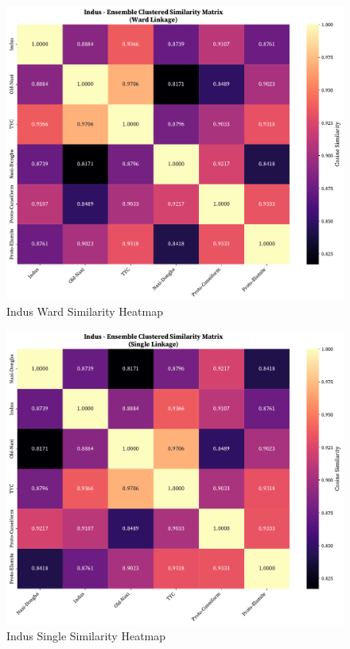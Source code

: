 \documentclass[11pt,a4paper,oneside]{report}
\begin{document}
 \begin{figure}[H]
    \centering
    \includegraphics[width=0.8\linewidth]{Visualizations/Clustered Heatmaps/Indus/ensemble_clustered_similarity_ward.pdf}
     \caption*{Indus Ward Similarity Heatmap}
\end{figure}
 \begin{figure}[H]
    \centering
    \includegraphics[width=0.8\linewidth]{Visualizations/Clustered Heatmaps/Indus/ensemble_clustered_similarity_single.pdf}
     \caption*{Indus Single Similarity Heatmap}
\end{figure}
\end{document}
